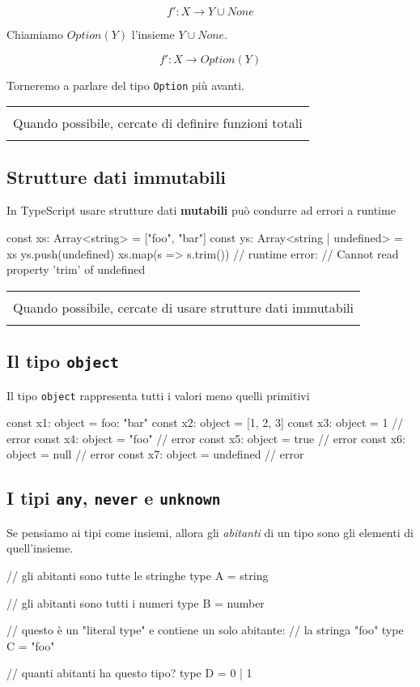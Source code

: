 \documentclass[12pt]{article}
\theoremstyle{definition}
\newenvironment{boxed}
    {\begin{center}
    \begin{tabular}{|p{0.9\textwidth}|}
    \hline\\
    }
    {
    \\\\\hline
    \end{tabular}
    \end{center}
    }
\newenvironment{code}
  {\vspace{0.5cm} \VerbatimEnvironment\begin{typescriptcode}}
  {\end{typescriptcode} \vspace{0.2cm}}
\begin{document}
$$
f': X \rightarrow Y \cup None
$$

Chiamiamo $Option(Y)$ l'insieme $Y \cup None$.

$$
f': X \rightarrow Option(Y)
$$

Torneremo a parlare del tipo \texttt{Option} più avanti.

\begin{boxed}
Quando possibile, cercate di definire funzioni totali
\end{boxed}

\subsection{Strutture dati immutabili}

In TypeScript usare strutture dati \textbf{mutabili} può condurre ad errori a runtime

\begin{code}
const xs: Array<string> = ["foo", "bar"]
const ys: Array<string | undefined> = xs
ys.push(undefined)
xs.map(s => s.trim())
// runtime error:
// Cannot read property 'trim' of undefined
\end{code}

\begin{boxed}
Quando possibile, cercate di usare strutture dati immutabili
\end{boxed}

\subsection{Il tipo \texttt{object}}

Il tipo \texttt{object} rappresenta tutti i valori meno quelli primitivi

\begin{code}
const x1: object = { foo: "bar" }
const x2: object = [1, 2, 3]
const x3: object = 1 // error
const x4: object = "foo" // error
const x5: object = true // error
const x6: object = null // error
const x7: object = undefined // error
\end{code}

\subsection{I tipi \texttt{any}, \texttt{never} e \texttt{unknown}}

Se pensiamo ai tipi come insiemi, allora gli \emph{abitanti} di un tipo sono gli elementi di quell'insieme.

\begin{code}
// gli abitanti sono tutte le stringhe
type A = string

// gli abitanti sono tutti i numeri
type B = number

// questo è un "literal type" e contiene un solo abitante:
// la stringa "foo"
type C = "foo"

// quanti abitanti ha questo tipo?
type D = 0 | 1
\end{code}
\end{document}

